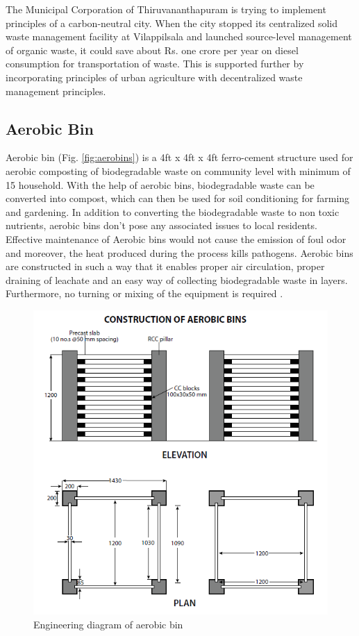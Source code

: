 \documentclass[12pt,a4paper]{report}
\begin{document}
The Municipal Corporation of Thiruvananthapuram is trying to implement principles of a carbon-neutral city. When the city stopped its centralized solid waste management facility at Vilappilsala and launched source-level management of organic waste, it could save about Rs. one crore per year on diesel consumption for transportation of waste. This is supported further by incorporating principles of urban agriculture with decentralized waste management principles.

\subsection{Aerobic Bin}
Aerobic bin (Fig. \ref{fig:aerobins}) is a 4ft x 4ft x 4ft ferro-cement structure used for aerobic composting of biodegradable waste on community level with minimum of 15 household. With the help of aerobic bins, biodegradable waste can be converted into compost, which can then be used for soil conditioning for farming and gardening. In addition to converting the biodegradable waste to non toxic nutrients, aerobic bins don’t pose any associated issues to local residents. Effective maintenance of Aerobic bins would not cause the emission of foul odor and moreover, the heat produced during the process kills pathogens. Aerobic bins are constructed in such a way that it enables proper air circulation, proper draining of leachate and an easy way of collecting biodegradable waste in layers. Furthermore, no turning or mixing of the equipment is required \cite{thanal}.

\begin{figure}[H]
	\centering
	\includegraphics[width=0.65\linewidth]{eng_dia_aero}
	\caption{Engineering diagram of aerobic bin}
	\label{fig:engdiaaero}
\end{figure}
\end{document}
